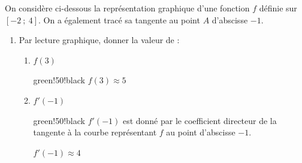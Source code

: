 On considère ci-dessous la représentation graphique d'une fonction $f$ définie sur $[-2~;~4]$. On a également tracé sa tangente au point $A$ d'abscisse $-1$.
	
	\medskip
	
	\begin{minipage}{0.46\linewidth}
		\begin{enumerate}
			\item Par lecture graphique, donner la valeur de :
			\begin{enumerate}
				\item $f(3)$
				
				\begin{color}{green!50!black}
				$f(3)\approx 5$
		 		\end{color}

				
				
				\item $f'(-1)$
				
				\begin{color}{green!50!black}
				$f'(-1)$ est donné par le coefficient directeur de la tangente à la courbe représentant $f$ au point d'abscisse $-1$.				
				
				$f'(-1)\approx 4$
		 		\end{color}
				
			\end{enumerate}
		\end{enumerate}
		
		
		
	\end{minipage}
	\hfill
